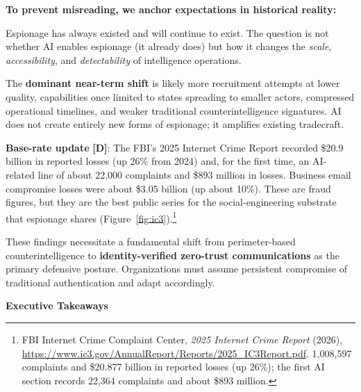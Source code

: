 \documentclass[11pt,letterpaper]{article}
\newcommand{\etraneed}[1]{\par\ifdim\pagegoal<\maxdimen\ifdim\pagetotal<\pagegoal\ifdim\dimexpr\pagegoal-\pagetotal\relax<\dimexpr#1\relax\newpage\fi\fi\fi}
\begin{document}
\vspace{0.5cm}

\begin{infobox}
\textbf{To prevent misreading, we anchor expectations in historical reality:}

Espionage has always existed and will continue to exist. The question is not whether AI enables espionage (it already does) but how it changes the \textit{scale}, \textit{accessibility}, and \textit{detectability} of intelligence operations.

The \textbf{dominant near-term shift} is likely more recruitment attempts at lower quality, capabilities once limited to states spreading to smaller actors, compressed operational timelines, and weaker traditional counterintelligence signatures. AI does not create entirely new forms of espionage; it amplifies existing tradecraft.

\textbf{Base-rate update} \textbf{[D]}: The FBI's 2025 Internet Crime Report recorded \$20.9 billion in reported losses (up 26\% from 2024) and, for the first time, an AI-related line of about 22,000 complaints and \$893 million in losses. Business email compromise losses were about \$3.05 billion (up about 10\%). These are fraud figures, but they are the best public series for the social-engineering substrate that espionage shares (Figure~\ref{fig:ic3}).\footnote{FBI Internet Crime Complaint Center, \textit{2025 Internet Crime Report} (2026), \url{https://www.ic3.gov/AnnualReport/Reports/2025_IC3Report.pdf}. 1,008,597 complaints and \$20.877 billion in reported losses (up 26\%); the first AI section records 22,364 complaints and about \$893 million.}
\end{infobox}

\vspace{0.3cm}

\begin{keybox}
These findings necessitate a fundamental shift from perimeter-based counterintelligence to \textbf{identity-verified zero-trust communications} as the primary defensive posture. Organizations must assume persistent compromise of traditional authentication and adapt accordingly.
\end{keybox}

\etraneed{14\baselineskip}
\vspace{0.6cm}
\begin{center}
{\color{shadowdark}\Large\bfseries Executive Takeaways}
\end{center}
\vspace{0.2cm}
\end{document}
